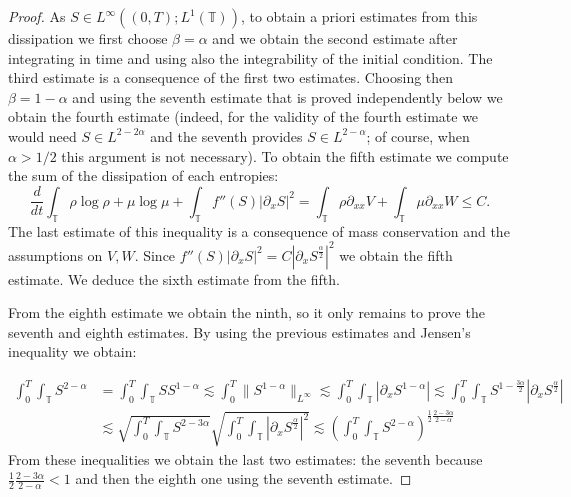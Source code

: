 \documentclass[10pt,a4paper]{amsart}
\newcommand {\T}  { {\mathbb{T}} }
\begin{document}
\begin{proof}
As $S\in L^{\infty}((0,T); L^{1}(\T))$, to obtain a priori estimates from this dissipation we first choose $\beta=\alpha$  and we obtain the second estimate after integrating in time and using also the integrability of the initial condition. The third estimate is a consequence of the first two estimates. Choosing then $\beta=1-\alpha$ and using the seventh estimate that is proved independently below we obtain the fourth estimate (indeed, for the validity of the fourth estimate we would need $S\in L^{2-2\alpha}$ and the seventh provides $S\in L^{2-\alpha}$; of course, when $\alpha>1/2$ this argument is not necessary).
To obtain the fifth estimate we compute the sum of the dissipation of each entropies: 
\begin{equation*}
\frac{d}{dt}\int_{\T}\rho\log\rho +\mu\log\mu + \int_{\T}f''(S)|\partial_xS|^2 = \int_{\T} \rho \partial_{xx}V +\int_{\T}\mu\partial_{xx}W\le C.   
\end{equation*}
The last estimate of this inequality is a consequence of mass conservation and the assumptions on $V,W$. Since $f''(S)|\partial_x S|^2 = C|\partial_x S^{\frac{\alpha}{2}}|^2$ we obtain the fifth estimate. We deduce the sixth estimate from the fifth.

From the eighth estimate we obtain the ninth, so it only remains to prove the seventh and eighth estimates. By using the previous estimates and Jensen's inequality we obtain:

\begin{align*}
\int_{0}^{T}\int_{\T}S^{2-\alpha}&= \int_{0}^{T}\int_{\T}SS^{1-\alpha}
\lesssim  \int_{0}^{T}\|S^{1-\alpha}\|_{L^{\infty}} \lesssim \int_{0}^{T}\int_{\T}\left|\partial_x S^{1-\alpha}\right|\lesssim \int_{0}^{T}\int_{\T}S^{1-\frac{3\alpha}{2}}|\partial_x S^{\frac{\alpha}{2}}|\\
&\lesssim \sqrt{\int_{0}^{T}\int_{\T}S^{2-3\alpha}}\sqrt{\int_{0}^{T}\int_{\T}|\partial_x S^{\frac{\alpha}{2}}|^2} \lesssim \left(\int_{0}^{T}\int_{\T}S^{2-\alpha}\right)^{\frac{1}{2}\frac{2-3\alpha}{2-\alpha}}
\end{align*}
From these inequalities we obtain the last two estimates: the seventh because $\frac{1}{2}\frac{2-3\alpha}{2-\alpha}<1$ and then the eighth one using the seventh estimate. 
\end{proof}
\end{document}
